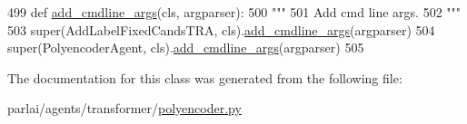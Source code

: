\begin{DoxyCode}
499     \textcolor{keyword}{def }\hyperlink{namespaceparlai_1_1agents_1_1drqa_1_1config_a62fdd5554f1da6be0cba185271058320}{add\_cmdline\_args}(cls, argparser):
500         \textcolor{stringliteral}{"""}
501 \textcolor{stringliteral}{        Add cmd line args.}
502 \textcolor{stringliteral}{        """}
503         super(AddLabelFixedCandsTRA, cls).\hyperlink{namespaceparlai_1_1agents_1_1drqa_1_1config_a62fdd5554f1da6be0cba185271058320}{add\_cmdline\_args}(argparser)
504         super(PolyencoderAgent, cls).\hyperlink{namespaceparlai_1_1agents_1_1drqa_1_1config_a62fdd5554f1da6be0cba185271058320}{add\_cmdline\_args}(argparser)
505 \end{DoxyCode}


The documentation for this class was generated from the following file\+:\begin{DoxyCompactItemize}
\item 
parlai/agents/transformer/\hyperlink{polyencoder_8py}{polyencoder.\+py}\end{DoxyCompactItemize}
